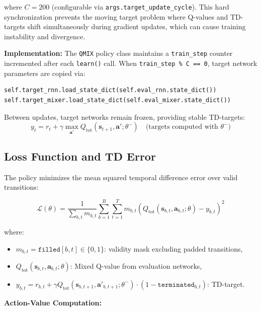 where \(C = 200\) (configurable via \texttt{args.target\_update\_cycle}). This hard synchronization prevents the moving target problem where Q-values and TD-targets shift simultaneously during gradient updates, which can cause training instability and divergence.

\textbf{Implementation:} The \texttt{QMIX} policy class maintains a \texttt{train\_step} counter incremented after each \texttt{learn()} call. When \texttt{train\_step \% C == 0}\), target network parameters are copied via:
\begin{verbatim}
self.target_rnn.load_state_dict(self.eval_rnn.state_dict())
self.target_mixer.load_state_dict(self.eval_mixer.state_dict())
\end{verbatim}

Between updates, target networks remain frozen, providing stable TD-targets:
\[
y_t = r_t + \gamma \max_{\mathbf{a}'} Q_{\text{tot}}(\mathbf{s}_{t+1}, \mathbf{a}'; \theta^-) \quad \text{(targets computed with } \theta^- \text{)}
\]

\subsection{Loss Function and TD Error}
\label{sec:loss_function}

The policy minimizes the mean squared temporal difference error over valid transitions:

\begin{equation}
\mathcal{L}(\theta) = \frac{1}{\sum_{b,t} m_{b,t}} \sum_{b=1}^{B} \sum_{t=1}^{T} m_{b,t} \left( Q_{\text{tot}}(\mathbf{s}_{b,t}, \mathbf{a}_{b,t}; \theta) - y_{b,t} \right)^2
\end{equation}

where:
\begin{itemize}
\item \(m_{b,t} = \texttt{filled}[b,t] \in \{0,1\}\): validity mask excluding padded transitions,
\item \(Q_{\text{tot}}(\mathbf{s}_{b,t}, \mathbf{a}_{b,t}; \theta)\): Mixed Q-value from evaluation networks,
\item \(y_{b,t} = r_{b,t} + \gamma Q_{\text{tot}}(\mathbf{s}_{b,t+1}, \mathbf{a}'_{b,t+1}; \theta^-) \cdot (1 - \texttt{terminated}_{b,t})\): TD-target.
\end{itemize}

\textbf{Action-Value Computation:}


